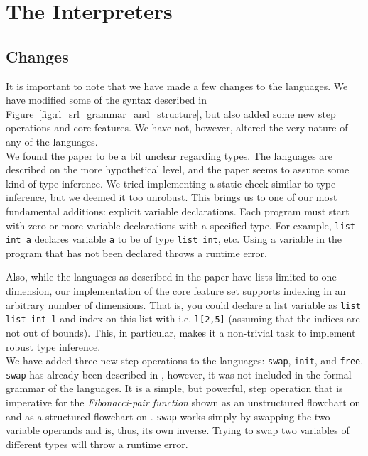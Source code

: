 
\section{The Interpreters}

\subsection{Changes}\label{sec:changes}

It is important to note that we have made a few changes to the languages. We have modified some of the syntax described in Figure~\ref{fig:rl_srl_grammar_and_structure}, but also added some new step operations and core features. We have not, however, altered the very nature of any of the languages.\\

\noindent We found the paper\cite{REV} to be a bit unclear regarding types. The languages are described on the more hypothetical level, and the paper seems to assume some kind of type inference. We tried implementing a static check similar to type inference, but we deemed it too unrobust. This brings us to one of our most fundamental additions: explicit variable declarations. Each program must start with zero or more variable declarations with a specified type. For example, \texttt{list int a} declares variable \texttt{a} to be of type \texttt{list int}, etc. Using a variable in the program that has not been declared throws a runtime error.

Also, while the languages as described in the paper have lists limited to one dimension, our implementation of the core feature set supports indexing in an arbitrary number of dimensions. That is, you could declare a list variable as \texttt{list list int l} and index on this list with i.e. \texttt{l[2,5]} (assuming that the indices are not out of bounds). This, in particular, makes it a non-trivial task to implement robust type inference.\\


\noindent We have added three new step operations to the languages: \texttt{swap}, \texttt{init}, and \texttt{free}. \texttt{swap} has already been described in \cite[p.~99]{REV}, however, it was not included in the formal grammar of the languages. It is a simple, but powerful, step operation that is imperative for the \textit{Fibonacci-pair function} shown as an unstructured flowchart on \cite[p.~99]{REV} and as a structured flowchart on \cite[p.~93]{REV}. \texttt{swap} works simply by swapping the two variable operands and is, thus, its own inverse. Trying to swap two variables of different types will throw a runtime error.

